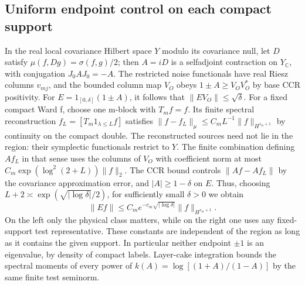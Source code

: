 \documentclass[11pt]{article}
\begin{document}
\subsection{Uniform endpoint control on each compact support}
In the real local covariance Hilbert space $Y$ modulo its covariance
null, let $D$ satisfy $\mu(f,Dg)=\sigma(f,g)/2$; then $A=iD$ is a
selfadjoint contraction on $Y_\mathbb{C}$, with conjugation
$J_0 A J_0=-A$. The restricted noise functionals have real Riesz
columns $v_{mj}$, and the bounded column map $V_O$ obeys
$1\pm A\ge V_O V_O^*$ by base CCR positivity. For
$E=1_{[0,\delta]}(1\pm A)$, it follows that
$\|EV_O\|\le \sqrt\delta$. For a fixed compact Ward f, choose
one m-block with $T_m f=f$. Its finite spectral reconstruction
$f_L=[T_m1_{\lambda\le L}f]$ satisfies
$\|f-f_L\|_\mu\le C_m L^{-1}\|f\|_{H^{s_m+1}}$ by continuity
on the compact double. The reconstructed sources need not lie in
the region: their symplectic functionals restrict to $Y$.
The finite combination defining $A f_L$ in that sense uses the
columns of $V_O$ with coefficient norm at most
$C_m\exp(\log^2(2+L))\|f\|_2$.
The CCR bound controls $\|A f-A f_L\|$ by the covariance
approximation error, and $|A|\ge1-\delta$ on $E$. Thus, choosing
$L+2\asymp \exp(\sqrt{|\log\delta|}/2)$, for sufficiently small
$\delta>0$ we obtain
\begin{equation}
 \|Ef\|\le C_m e^{-c_m\sqrt{|\log\delta|}}\|f\|_{H^{s_m+1}}.
                                                               \label{eq:gendpoints}
\end{equation}
On the left only the physical class matters, while on the right
one uses any fixed-support test representative. These constants
are independent of the region as long as it contains the given
support. In particular neither endpoint $\pm1$ is an eigenvalue,
by density of compact labels. Layer-cake integration bounds the
spectral moments of every power of
$k(A)=\log[(1+A)/(1-A)]$ by the same finite test seminorm.
\end{document}
